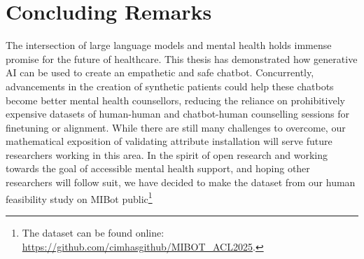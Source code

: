 \section{Concluding Remarks}

The intersection of large language models and mental health holds immense promise for the future of healthcare. This thesis has demonstrated how generative AI can be used to create an empathetic and safe chatbot. Concurrently, advancements in the creation of synthetic patients could help these chatbots become better mental health counsellors, reducing the reliance on prohibitively expensive datasets of human-human and chatbot-human counselling sessions for finetuning or alignment. While there are still many challenges to overcome, our mathematical exposition of validating attribute installation will serve future researchers working in this area. In the spirit of open research and working towards the goal of accessible mental health support, and hoping other researchers will follow suit, we have decided to make the dataset from our human feasibility study on MIBot public\footnote{The dataset can be found online: \href{https://github.com/cimhasgithub/MIBOT\_ACL2025}{https://github.com/cimhasgithub/MIBOT\_ACL2025}.}